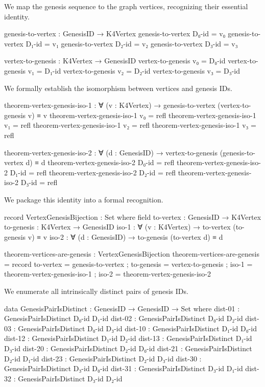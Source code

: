 \documentclass[11pt,a4paper]{book}
\begin{document}
We map the genesis sequence to the graph vertices, recognizing their essential identity.

\begin{code}
genesis-to-vertex : GenesisID → K4Vertex
genesis-to-vertex D₀-id = v₀
genesis-to-vertex D₁-id = v₁
genesis-to-vertex D₂-id = v₂
genesis-to-vertex D₃-id = v₃

vertex-to-genesis : K4Vertex → GenesisID
vertex-to-genesis v₀ = D₀-id
vertex-to-genesis v₁ = D₁-id
vertex-to-genesis v₂ = D₂-id
vertex-to-genesis v₃ = D₃-id

\end{code}

We formally establish the isomorphism between vertices and genesis IDs.

\begin{code}
theorem-vertex-genesis-iso-1 : ∀ (v : K4Vertex) → genesis-to-vertex (vertex-to-genesis v) ≡ v
theorem-vertex-genesis-iso-1 v₀ = refl
theorem-vertex-genesis-iso-1 v₁ = refl
theorem-vertex-genesis-iso-1 v₂ = refl
theorem-vertex-genesis-iso-1 v₃ = refl

theorem-vertex-genesis-iso-2 : ∀ (d : GenesisID) → vertex-to-genesis (genesis-to-vertex d) ≡ d
theorem-vertex-genesis-iso-2 D₀-id = refl
theorem-vertex-genesis-iso-2 D₁-id = refl
theorem-vertex-genesis-iso-2 D₂-id = refl
theorem-vertex-genesis-iso-2 D₃-id = refl

\end{code}

We package this identity into a formal recognition.

\begin{code}
record VertexGenesisBijection : Set where
  field
    to-vertex : GenesisID → K4Vertex
    to-genesis : K4Vertex → GenesisID
    iso-1 : ∀ (v : K4Vertex) → to-vertex (to-genesis v) ≡ v
    iso-2 : ∀ (d : GenesisID) → to-genesis (to-vertex d) ≡ d

theorem-vertices-are-genesis : VertexGenesisBijection
theorem-vertices-are-genesis = record
  { to-vertex = genesis-to-vertex
  ; to-genesis = vertex-to-genesis
  ; iso-1 = theorem-vertex-genesis-iso-1
  ; iso-2 = theorem-vertex-genesis-iso-2
  }

\end{code}

We enumerate all intrinsically distinct pairs of genesis IDs.

\begin{code}
data GenesisPairIsDistinct : GenesisID → GenesisID → Set where
  dist-01 : GenesisPairIsDistinct D₀-id D₁-id
  dist-02 : GenesisPairIsDistinct D₀-id D₂-id
  dist-03 : GenesisPairIsDistinct D₀-id D₃-id
  dist-10 : GenesisPairIsDistinct D₁-id D₀-id
  dist-12 : GenesisPairIsDistinct D₁-id D₂-id
  dist-13 : GenesisPairIsDistinct D₁-id D₃-id
  dist-20 : GenesisPairIsDistinct D₂-id D₀-id
  dist-21 : GenesisPairIsDistinct D₂-id D₁-id
  dist-23 : GenesisPairIsDistinct D₂-id D₃-id
  dist-30 : GenesisPairIsDistinct D₃-id D₀-id
  dist-31 : GenesisPairIsDistinct D₃-id D₁-id
  dist-32 : GenesisPairIsDistinct D₃-id D₂-id

\end{code}
\end{document}
